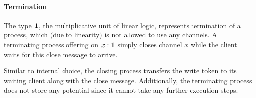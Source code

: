 \paragraph*{\textbf{Termination}}
The type $\mathbf{1}$, the multiplicative unit of linear logic, represents
termination of a process, which (due to linearity) is not allowed to use
any channels. A terminating process offering on $x : \mathbf{1}$ simply
closes channel $x$ while the client waits for this close message to arrive.
Similar to internal choice, the closing process transfers the write
token to its waiting client along with the close message.
Additionally, the terminating process does not store
any potential since it cannot take any further execution steps.


